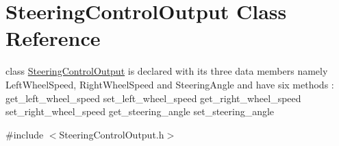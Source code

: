 \hypertarget{classSteeringControlOutput}{}\section{Steering\+Control\+Output Class Reference}
\label{classSteeringControlOutput}


class \hyperlink{classSteeringControlOutput}{Steering\+Control\+Output} is declared with its three data members namely Left\+Wheel\+Speed, Right\+Wheel\+Speed and Steering\+Angle and have six methods \+: get\+\_\+left\+\_\+wheel\+\_\+speed set\+\_\+left\+\_\+wheel\+\_\+speed get\+\_\+right\+\_\+wheel\+\_\+speed set\+\_\+right\+\_\+wheel\+\_\+speed get\+\_\+steering\+\_\+angle set\+\_\+steering\+\_\+angle  




{\ttfamily \#include $<$Steering\+Control\+Output.\+h$>$}

